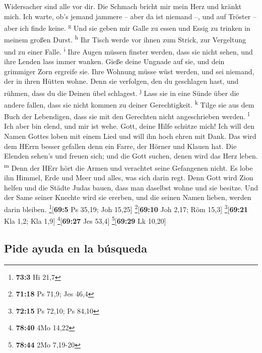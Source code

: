 Widersacher sind alle vor dir.  Die Schmach bricht mir
mein Herz und kränkt mich. Ich warte, ob's jemand jammere -- aber da ist
niemand --, und auf Tröster -- aber ich finde keine. \textsuperscript{g}
 Und sie geben mir Galle zu essen und Essig zu trinken in
meinem großen Durst. \textsuperscript{h}  Ihr Tisch werde
vor ihnen zum Strick, zur Vergeltung und zu einer Falle.
\textsuperscript{i}  Ihre Augen müssen finster werden,
dass sie nicht sehen, und ihre Lenden lass immer wanken. 
Gieße deine Ungnade auf sie, und dein grimmiger Zorn ergreife sie.
 Ihre Wohnung müsse wüst werden, und sei niemand, der in
ihren Hütten wohne.  Denn sie verfolgen, den du
geschlagen hast, und rühmen, dass du die Deinen übel schlagest.
\textsuperscript{j}  Lass sie in eine Sünde über die
andere fallen, dass sie nicht kommen zu deiner Gerechtigkeit.
\textsuperscript{k}  Tilge sie aus dem Buch der
Lebendigen, dass sie mit den Gerechten nicht angeschrieben werden.
\textsuperscript{l}  Ich aber bin elend, und mir ist
wehe. Gott, deine Hilfe schütze mich!  Ich will den Namen
Gottes loben mit einem Lied und will ihn hoch ehren mit Dank.
 Das wird dem HErrn besser gefallen denn ein Farre, der
Hörner und Klauen hat.  Die Elenden sehen's und freuen
sich; und die Gott suchen, denen wird das Herz leben.
\textsuperscript{m}  Denn der HErr hört die Armen und
verachtet seine Gefangenen nicht.  Es lobe ihn Himmel,
Erde und Meer und alles, was sich darin regt.  Denn Gott
wird Zion helfen und die Städte Judas bauen, dass man daselbst wohne und
sie besitze.  Und der Same seiner Knechte wird sie
ererben, und die seinen Namen lieben, werden darin bleiben.
\footnote{\textbf{73:3} Hi 21,7}{[}\textbf{69:5} Ps 35,19; Joh 15,25{]}
\footnote{\textbf{71:18} Ps 71,9; Jes 46,4}{[}\textbf{69:10} Joh 2,17;
Röm 15,3{]} \footnote{\textbf{72:15} Ps 72,10; Ps 84,10}{[}\textbf{69:21}
Kla 1,2; Kla 1,9{]} \footnote{\textbf{78:40} 4Mo 14,22}{[}\textbf{69:27}
Jes 53,4{]} \footnote{\textbf{78:44} 2Mo 7,19-20}{[}\textbf{69:29} Lk
10,20{]}

\hypertarget{pide-ayuda-en-la-buxfasqueda}{%
\subsection{Pide ayuda en la
búsqueda}\label{pide-ayuda-en-la-buxfasqueda}}

